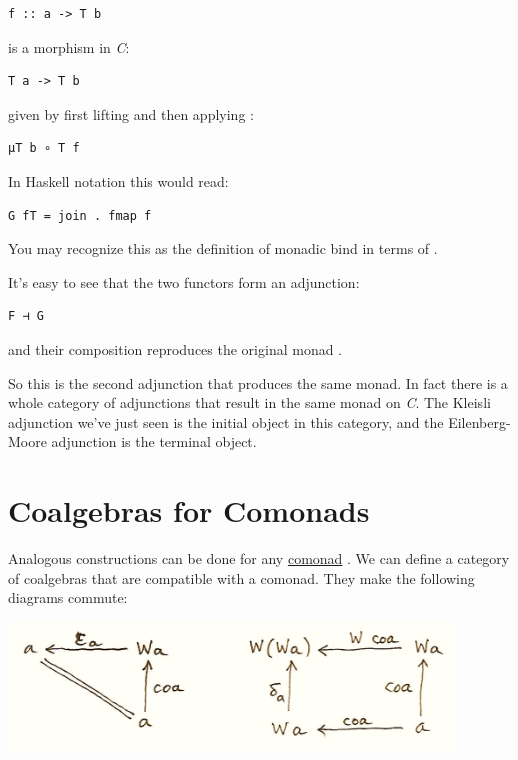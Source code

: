 \begin{verbatim}
f :: a -> T b
\end{verbatim}

is a morphism in \emph{C}:

\begin{verbatim}
T a -> T b
\end{verbatim}

given by first lifting  and then applying :

\begin{verbatim}
μT b ∘ T f
\end{verbatim}

In Haskell notation this would read:

\begin{verbatim}
G fT = join . fmap f
\end{verbatim}

You may recognize this as the definition of monadic bind in terms of
.

It's easy to see that the two functors form an adjunction:

\begin{verbatim}
F ⊣ G
\end{verbatim}

and their composition  reproduces the original monad
.

So this is the second adjunction that produces the same monad. In fact
there is a whole category of adjunctions  that result
in the same monad  on \emph{C}. The Kleisli adjunction we've
just seen is the initial object in this category, and the
Eilenberg-Moore adjunction is the terminal object.

\section{Coalgebras for Comonads}\label{coalgebras-for-comonads}

Analogous constructions can be done for any
\href{https://bartoszmilewski.com/2017/01/02/comonads/}{comonad}
. We can define a category of coalgebras that are compatible
with a comonad. They make the following diagrams commute:

\includegraphics[width=4.67708in]{images/talg5.png}

